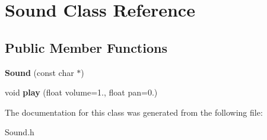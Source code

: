 \hypertarget{classSound}{}\section{Sound Class Reference}
\label{classSound}
\subsection*{Public Member Functions}
\begin{DoxyCompactItemize}
\item 
\mbox{\label{classSound_ac85830f0d7c950d28141164edc7fe990}} 
{\bfseries Sound} (const char $\ast$)
\item 
\mbox{\label{classSound_aeaa88e449a4e8f3503628452238d833c}} 
void {\bfseries play} (float volume=1., float pan=0.)
\end{DoxyCompactItemize}


The documentation for this class was generated from the following file\+:\begin{DoxyCompactItemize}
\item 
Sound.\+h\end{DoxyCompactItemize}
